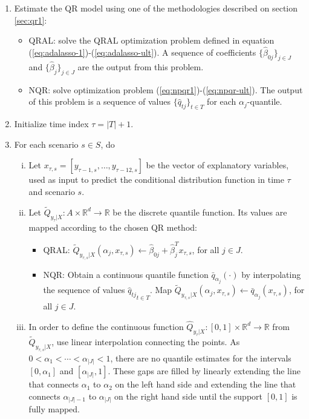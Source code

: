 \begin{enumerate}
	
	\item Estimate the QR model using one of the methodologies described on section \ref{sec:qr1}:  
	\begin{itemize}
		\item QRAL: solve the QRAL optimization problem defined in equation (\ref{eq:adalasso-1})-(\ref{eq:adalasso-ult}). 
		A sequence of coefficients $\{ \hat\beta_{0j} \}_{j \in J}$ and $\{ \hat\beta_{j} \}_{j \in J}$ are the output from this problem. 
		\item NQR: solve optimization problem (\ref{eq:npqr1})-(\ref{eq:npqr-ult}). The output of this problem is a sequence of values $\{ \hat q_{tj} \}_{t \in T}$ for each $\alpha_j$-quantile. 
	\end{itemize}

	\item Initialize time index $\tau = |T| + 1$.
	
	\item For each scenario $s \in S$, do
		\begin{enumerate}[i)]

		\item Let $x_{\tau,s} = [y_{\tau-1,s}, \dots, y_{\tau-12,s}]$ be the vector of explanatory variables, used as input to predict the conditional distribution function in time $\tau$ and scenario $s$.

		\item Let $\tilde{Q}_{y_\tau|X}:A \times \mathbb{R}^d \rightarrow \mathbb{R}$ be the discrete quantile function. Its values are mapped according to the chosen QR method:
		\begin{itemize}
			\item QRAL: $\tilde Q_{y_{\tau,s}|X}(\alpha_j, x_{\tau,s}) \leftarrow \hat\beta_{0j} + \hat\beta_j^T x_{\tau,s}$, for all $j \in J$.
			
			\item NQR: Obtain a continuous quantile function $\bar q_{\alpha_j}(\cdot)$ by interpolating the sequence of values ${\hat q_{tj}}_{t \in T}$. 
			Map $\tilde Q_{y_{\tau,s}|X}(\alpha_j, x_{\tau,s}) \leftarrow \bar q_{\alpha_j}( x_{\tau,s})$, for all $j \in J$.

			\end{itemize}

			\item In order to define the continuous function $\hat{Q}_{y_\tau|X}:[0,1] \times \mathbb{R}^d \rightarrow \mathbb{R}$ from $\tilde Q_{y_{\tau,s}|X}$, use linear interpolation connecting the points. As $0 < \alpha_1 < \cdots < \alpha_{|J|} < 1$, there are no quantile estimates for the intervals $[0,\alpha_1]$ and $[\alpha_{|J|},1]$. These gaps are filled by linearly extending the line that connects $\alpha_1$ to $\alpha_2$ on the left hand side and extending the line that connects $\alpha_{|J|-1}$ to $\alpha_{|J|}$ on the right hand side until the support $[0,1]$ is fully mapped.  


\end{enumerate}
\end{enumerate}
